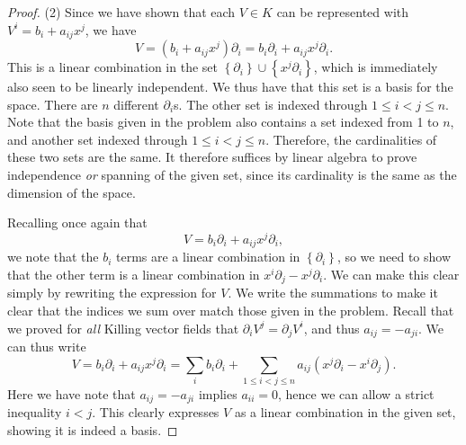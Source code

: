 \documentclass[11pt, letterpaper]{article}
\begin{document}
\begin{proof}
	(2) Since we have shown that each $V\in K$ can be represented with $V^i=b_i+a_{ij} x^j$, we have
	\[
		V=\left( b_i+a_{ij} x^j \right) \partial _i = b_i \partial _i + a_{ij} x^j \partial _i
	.\]
	This is a linear combination in the set $\left\{ \partial _i \right\} \cup \left\{ x^j \partial _i \right\} $, which is immediately also seen to be linearly independent. We thus have that this set is a basis for the space. There are $n$ different $\partial _i$s. The other set is indexed through $1 \leq i<j \leq n$. Note that the basis given in the problem also contains a set indexed from 1 to $n$, and another set indexed through $1 \leq i<j \leq n$. Therefore, the cardinalities of these two sets are the same. It therefore suffices by linear algebra to prove independence \emph{or} spanning of the given set, since its cardinality is the same as the dimension of the space.

	Recalling once again that
	\[
		V= b_i \partial _i + a_{ij} x^j \partial _i
	,\]
	we note that the $b_i$ terms are a linear combination in $\left\{ \partial _i \right\} $, so we need to show that the other term is a linear combination in $x^i \partial _j - x^j \partial _i$. We can make this clear simply by rewriting the expression for $V$. We write the summations to make it clear that the indices we sum over match those given in the problem. Recall that we proved for \emph{all} Killing vector fields that $\partial _iV^j = \partial _jV^i$, and thus $a_{ij} =-a_{ji} $. We can thus write
	\[
		V= b_i \partial _i + a_{ij} x^j \partial _i = \sum_{i} b_i \partial _i + \sum_{1 \leq i < j \leq n} a_{ij} \left( x^j \partial _i - x^i \partial _j \right) 
	.\]
	Here we have note that $a_{ij} =-a_{ji} $ implies $a_{ii} =0$, hence we can allow a strict inequality $i<j$. This clearly expresses $V$ as a linear combination in the given set, showing it is indeed a basis.
\end{proof}
\end{document}
